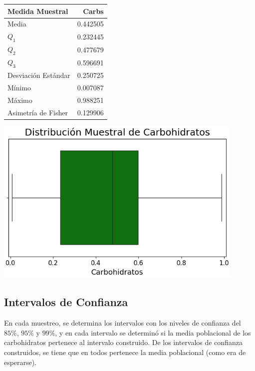 \documentclass[12pt,a4paper]{article}
\begin{document}
{{            \begin{minipage}{0.35\textwidth}
                \centering
                \begin{tabular}{l|r}
                \toprule
                    Medida Muestral & Carbs \\
                \midrule
                    Media               & 0.442505 \\
                    $Q_1$               & 0.232445 \\
                    $Q_2$               & 0.477679 \\
                    $Q_3$               & 0.596691 \\
                    Desviación Estándar & 0.250725 \\
                    Mínimo              & 0.007087 \\
                    Máximo              & 0.988251 \\
                    Asimetría de Fisher & 0.129906 \\
                \bottomrule
                \end{tabular}
            \end{minipage}%
            \begin{minipage}{0.65\textwidth}
                \centering
                \includegraphics[width=0.9\textwidth]{Resources/Sampling/Stratified.png}
            \end{minipage}
        }
    
        \subsection{Intervalos de Confianza}
        {
            En cada muestreo, se determina los intervalos 
            con los niveles de confianza del $85\%$, $95\%$ y $99\%$, 
            y en cada intervalo se determinó si la media poblacional de 
            los carbohidratos pertenece al intervalo construido. De los 
            intervalos de confianza construidos, se tiene que en todos
            pertenece la media poblacional (como era de esperarse).\\

}}
\end{document}
